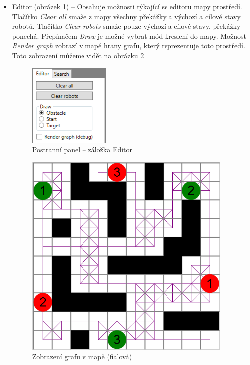 \begin{itemize}
	\item Editor (obrázek \ref{obr:sideEditor}) -- Obsahuje možnosti týkající se editoru mapy prostředí. Tlačítko \emph{Clear all} smaže z mapy všechny překážky a výchozí a cílové stavy robotů. Tlačítko \emph{Clear robots} smaže pouze výchozí a cílové stavy, překážky ponechá. Přepínačem \emph{Draw} je možné vybrat mód kreslení do mapy. Možnost \emph{Render graph} zobrazí v mapě hrany grafu, který reprezentuje toto prostředí. Toto zobrazení můžeme vidět na obrázku \ref{obr:renderGraph}
	\begin{figure}[htb]
		\begin{center}
			\includegraphics*[height=4cm,keepaspectratio]{obr/sideEditor}
		\end{center}
		\caption{Postranní panel -- záložka Editor}
		\label{obr:sideEditor}
	\end{figure}

\begin{figure}[htb]
\begin{center}
	\includegraphics*[height=10cm,keepaspectratio]{obr/renderGraph}
\end{center}
\caption{Zobrazení grafu v mapě (fialová)}
\label{obr:renderGraph}
\end{figure}
	

\end{itemize}
